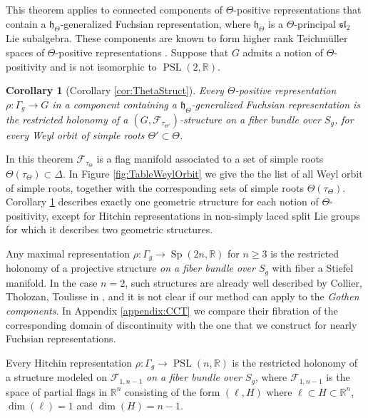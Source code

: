 \documentclass[reqno,10pt]{amsart}
\theoremstyle{plain}
\newtheorem{cor}[thm]{Corollary}
\theoremstyle{definition}
\theoremstyle{remark}
\newcommand{\type}{\tau}
\newcommand{\R}{\mathbb{R}}
\DeclareMathOperator{\PSL}{PSL}
\DeclareMathOperator{\Sp}{Sp}
\begin{document}
\medskip

This theorem applies to connected components of $\Theta$-positive representations that contain a $\mathfrak{h}_\Theta$-generalized Fuchsian representation, where $\mathfrak{h}_\Theta$ is a $\Theta$-principal $\mathfrak{sl}_2$ Lie subalgebra. These components are known to form higher rank Teichmüller spaces of $\Theta$-positive representations \cite{positivityLabourie}. Suppose that $G$ admits a notion of $\Theta$-positivity and is not isomorphic to $\PSL(2,\R)$.

\begin{cor}[Corollary \ref{cor:ThetaStruct}]
\label{cor:CayleyIntro}
Every $\Theta$-positive representation $\rho:\Gamma_g\to G$ in a component containing a $\mathfrak{h}_\Theta$-generalized Fuchsian representation is the restricted holonomy of a $(G, \mathcal{F}_{\type_{\Theta'}})$-structure on a fiber bundle over $S_g$, for every Weyl orbit of simple roots $\Theta'\subset \Theta$.
\end{cor}

In this theorem  $\mathcal{F}_{\type_\Theta}$ is a flag manifold associated to a set of simple roots $\Theta(\type_\Theta)\subset \Delta$. In Figure \ref{fig:TableWeylOrbit} we give the the list of all Weyl orbit of simple roots, together with the corresponding sets of simple roots $\Theta(\type_\Theta)$. Corollary \ref{cor:CayleyIntro} describes exactly one geometric structure  for each notion of $\Theta$-positivity, except for Hitchin representations in non-simply laced split Lie groups for which it describes two geometric structures. 


\medskip
Any maximal representation $\rho:\Gamma_g\to\Sp(2n,\R)$ for $n\geq 3$ is the restricted holonomy of a projective structure \emph{on a fiber bundle over $S_g$} with fiber a Stiefel manifold. In the case $n=2$, such structures are already well described by Collier, Tholozan, Toulisse in \cite{Collier_2019}, and it is not clear if our method can apply to the \emph{Gothen components}. In Appendix \ref{appendix:CCT} we compare their fibration of the corresponding domain of discontinuity with the one that we construct for nearly Fuchsian representations.

\medskip

Every Hitchin representation $\rho:\Gamma_g\to \PSL(n,\R)$ is the restricted holonomy of a structure modeled on $\mathcal{F}_{1,n-1}$ \emph{on a fiber bundle over $S_g$}, where $\mathcal{F}_{1,n-1}$ is the space of partial flags in $\R^n$ consisting of the form $(\ell,H)$ where $\ell\subset H\subset \R^n$, $\dim(\ell)=1$ and $\dim(H)=n-1$.
\end{document}
